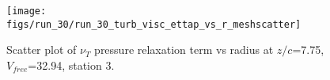 \begin{figure}[H]
\centering
\texttt{[image: figs/run\_30/run\_30\_turb\_visc\_ettap\_vs\_r\_meshscatter]}
\caption{Scatter plot of $\nu_T$ pressure relaxation term vs radius at $z/c$=7.75, $V_{free}$=32.94, station 3.}
\label{fig:run_30_turb_visc_ettap_vs_r_meshscatter}
\end{figure}


